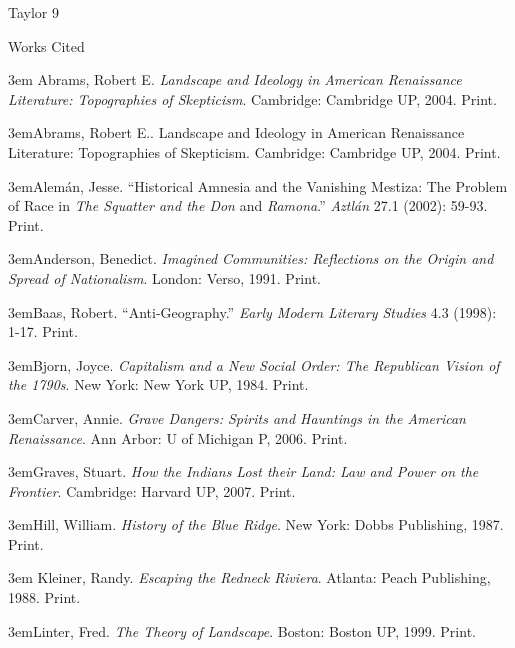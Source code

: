 \begin{tcolorbox}[enhanced,width=4.2in,left=.3in, right=.3in,
   drop fuzzy shadow southeast,
   halign=flush left,
    boxrule=0.4pt,sharp corners,colframe=black!80!black,colback=white!10]

\medskip

{\scriptsize \begin{flushright} Taylor 9 \end{flushright}

\begin{center}Works Cited \end{center}
\begin{doublespacing}
\hangindent3em{
Abrams, Robert E. \emph{Landscape and Ideology in American Renaissance Literature: Topographies of Skepticism}. Cambridge: Cambridge UP, 2004. Print.}

\hangindent3em{Abrams, Robert E.. Landscape and Ideology in American Renaissance 	Literature: Topographies of Skepticism. Cambridge: Cambridge UP, 2004. Print.}

\hangindent3em{Alemán, Jesse. “Historical Amnesia and the Vanishing Mestiza: The Problem of Race in \emph{The Squatter and the Don} and \emph{Ramona}.” \emph{Aztlán} 27.1 (2002): 59-93. Print.}

\hangindent3em{Anderson, Benedict. \emph{Imagined Communities: Reflections on the Origin and Spread of Nationalism}. London: Verso, 1991. Print.}

\hangindent3em{Baas, Robert. “Anti-Geography.” \emph{Early Modern Literary Studies} 4.3 (1998): 1-17. Print.}

\hangindent3em{Bjorn, Joyce. \emph{Capitalism and a New Social Order: The Republican Vision of 	the 1790s}. New York: New York UP, 1984. Print.}

\hangindent3em{Carver, Annie. \emph{Grave Dangers: Spirits and Hauntings in the American Renaissance}. Ann Arbor: U of Michigan P, 2006. Print.}

\hangindent3em{Graves, Stuart. \emph{How the Indians Lost their Land: Law and Power on the Frontier}. Cambridge: Harvard UP, 2007. Print.}

\hangindent3em{Hill, William. \emph{History of the Blue Ridge}. New York: Dobbs Publishing, 1987. Print.}

\hangindent3em{
Kleiner, Randy. \emph{Escaping the Redneck Riviera}. Atlanta: Peach Publishing, 1988. Print.
}

\hangindent3em{Linter, Fred. \emph{The Theory of Landscape}. Boston: Boston UP, 1999. Print.
}

\end{doublespacing}}

\bigskip
\bigskip

\end{tcolorbox}


